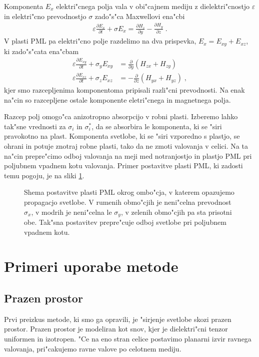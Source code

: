 \documentclass[12pt,twoside,openright,final]{report}
\newcommand{\odvod}[2]{\frac{\partial #1}{\partial #2}}
\newcommand{\eps}{\varepsilon}
\begin{document}
Komponenta $E_x$ elektri"cnega polja vala v obi"cajnem mediju z dielektri"cnostjo $\eps$ in elektri"cno prevodnostjo $\sigma$ zado"s"ca Maxwellovi ena"cbi
\begin{align}
 \eps \odvod{E_x}{t} + \sigma E_x = \odvod{H_z}{y} - \odvod{H_y}{z}\;.
\end{align}
V plasti \acs{PML} pa elektri"cno polje razdelimo na dva prispevka, $E_x = E_{xy} + E_{xz}$, ki zado"s"cata ena"cbam
\begin{align}
 \eps \odvod{E_{xy}}{t} + \sigma_y E_{xy} &= \odvod{}{y}(H_{zx} + H_{zy}) \\
 \eps \odvod{E_{xz}}{t} + \sigma_z E_{xz} &= -\odvod{}{z}(H_{yx} + H_{yz})\;,
\end{align}
kjer smo razcepljenima komponentoma pripisali razli"cni prevodnosti. 
Na enak na"cin so razcepljene ostale komponente eletri"cnega in magnetnega polja. 

Razcep polj omogo"ca anizotropno absorpcijo v robni plasti. 
Izberemo lahko tak"sne vrednosti za $\sigma_i$ in $\sigma^*_i$, da se absorbira le komponenta, ki se "siri pravokotno na plast. 
Komponenta svetlobe, ki se "siri vzporedno s plastjo, se ohrani in potuje znotraj robne plasti, tako da ne zmoti valovanja v celici. 
Na ta na"cin prepre"cimo odboj valovanja na meji med notranjostjo in plastjo \acs{PML} pri poljubnem vpadnem kotu valovanja. 
Primer postavitve plasti \acs{PML}, ki zadosti temu pogoju, je na sliki \ref{fig:pml-shema}. 

\begin{figure}[!htbp]
 \centering
 \def\svgwidth{.4\textwidth}
 
 \caption{Shema postavitve plasti \acs{PML} okrog ombo"cja, v katerem opazujemo propagacjo svetlobe. V rumenih obmo"cjih je neni"celna prevodnost $\sigma_x$, v modrih je neni"celna le $\sigma_y$, v zelenih obmo"cjih pa sta prisotni obe. Tak"sna postavitev prepre"cuje odboj svetlobe pri poljubnem vpadnem kotu\cite{taflove}. }
 \label{fig:pml-shema}
\end{figure}


\chapter{Primeri uporabe metode}

\section{Prazen prostor}
Prvi preizkus metode, ki smo ga opravili, je "sirjenje svetlobe skozi prazen prostor. 
Prazen prostor je modeliran kot snov, kjer je dielektri"cni tenzor uniformen in izotropen. 
"Ce na eno stran celice postavimo planarni izvir ravnega valovanja, pri"cakujemo ravne valove po celotnem mediju. 
\end{document}
